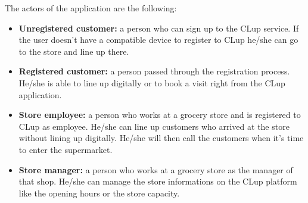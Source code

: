 The actors of the application are the following:
\begin{itemize}
    \item \textbf{Unregistered customer:} a person who can sign up to the CLup service. If the user doesn't have a compatible device to register to CLup he/she can go to the store and line up there.
    \item \textbf{Registered customer:} a person passed through the registration process. He/she is able to line up digitally or to book a visit right from the CLup application.
    \item \textbf{Store employee:} a person who works at a grocery store and is registered to CLup as employee. He/she can line up customers who arrived at the store without lining up digitally. He/she will then call the customers when it's time to enter the supermarket.
    \item \textbf{Store manager:} a person who works at a grocery store as the manager of that shop. He/she can manage the store informations on the CLup platform like the opening hours or the store capacity.
\end{itemize}